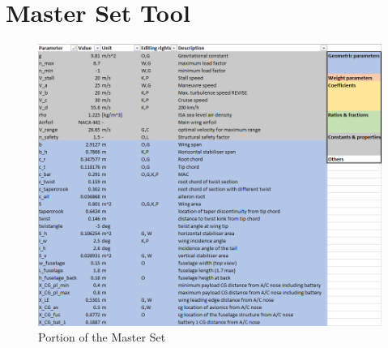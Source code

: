 \chapter{Master Set Tool}
\setlength{\parindent}{15pt}
\label{ch:mast_set}

\begin{figure}[H]
    \centering
    \includegraphics[scale=0.6]{Appendices/Figures/masterset}
    \caption{Portion of the Master Set}
    \label{fig:port_mast_set}
\end{figure}